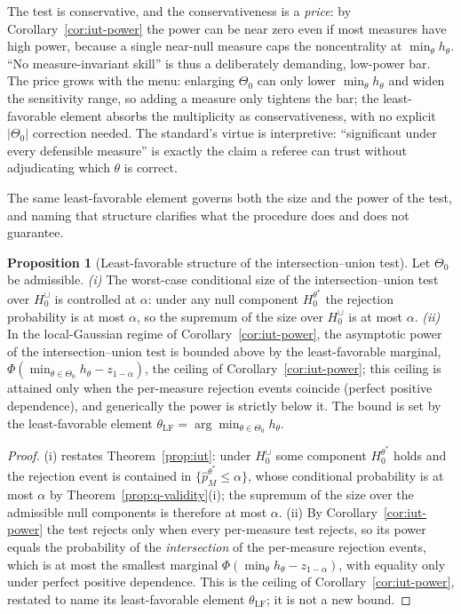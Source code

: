 \documentclass[preprint,12pt]{elsarticle}
\theoremstyle{definition}
\newtheorem{proposition}[theorem]{Proposition}
\begin{document}
The test is conservative, and the conservativeness is a \emph{price}: by
Corollary~\ref{cor:iut-power} the power can be near zero even if most measures have
high power, because a single near-null measure caps the noncentrality at
$\min_\theta h_\theta$. ``No measure-invariant skill'' is thus a deliberately
demanding, low-power bar. The price grows with the menu: enlarging $\Theta_0$ can
only lower $\min_\theta h_\theta$ and widen the sensitivity range, so adding a
measure only tightens the bar; the least-favorable element absorbs the multiplicity
as conservativeness, with no explicit $|\Theta_0|$ correction needed. The
standard's virtue is interpretive: ``significant under every defensible measure''
is exactly the claim a referee can trust without adjudicating which $\theta$ is
correct.

The same least-favorable element governs both the size and the power of the test,
and naming that structure clarifies what the procedure does and does not guarantee.

\begin{proposition}[Least-favorable structure of the intersection--union test]
\label{prop:minimax}
Let $\Theta_0$ be admissible.
\emph{(i)} The worst-case conditional size of the intersection--union test over
$H_0^{\cup}$ is controlled at $\alpha$: under any null component $H_0^{\theta^\ast}$
the rejection probability is at most $\alpha$, so the supremum of the size over
$H_0^{\cup}$ is at most $\alpha$.
\emph{(ii)} In the local-Gaussian regime of Corollary~\ref{cor:iut-power}, the
asymptotic power of the intersection--union test is bounded above by the
least-favorable marginal,
$\Phi(\min_{\theta\in\Theta_0}h_\theta-z_{1-\alpha})$, the ceiling of
Corollary~\ref{cor:iut-power}; this ceiling is attained only when the per-measure
rejection events coincide (perfect positive dependence), and generically the power
is strictly below it. The bound is set by the least-favorable element
$\theta_{\mathrm{LF}}=\arg\min_{\theta\in\Theta_0}h_\theta$.
\end{proposition}

\begin{proof}
(i) restates Theorem~\ref{prop:iut}: under $H_0^{\cup}$ some component
$H_0^{\theta^\ast}$ holds and the rejection event is contained in
$\{\hat p_M^{\theta^\ast}\le\alpha\}$, whose conditional probability is at most
$\alpha$ by Theorem~\ref{prop:q-validity}(i); the supremum of the size over the
admissible null components is therefore at most $\alpha$. (ii) By
Corollary~\ref{cor:iut-power} the test rejects only when every per-measure test
rejects, so its power equals the probability of the \emph{intersection} of the
per-measure rejection events, which is at most the smallest marginal
$\Phi(\min_\theta h_\theta-z_{1-\alpha})$, with equality only under perfect
positive dependence. This is the ceiling of Corollary~\ref{cor:iut-power}, restated
to name its least-favorable element $\theta_{\mathrm{LF}}$; it is not a new bound.
\end{proof}
\end{document}
